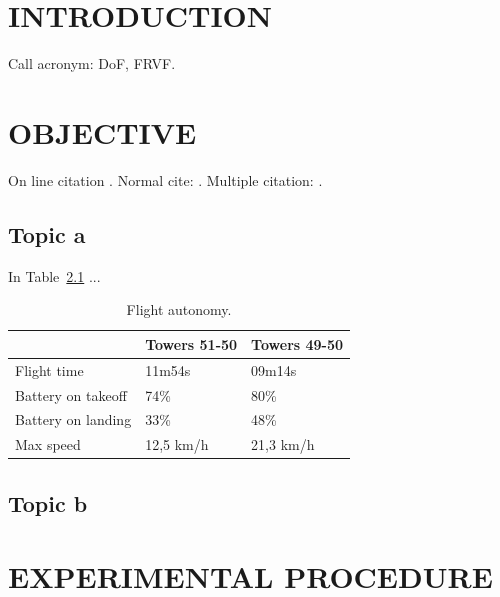 \chapter{INTRODUCTION}
\label{chap:introduction}

Call acronym: \ac{DoF}, \ac{FRVF}.

\lipsum[1-2]

\chapter{OBJECTIVE}
\label{chap:objetive}

On line citation .
Normal cite: \cite{earnshaw2014virtual}. Multiple citation: \cite{azuma1997survey, earnshaw2014virtual}.

\section{Topic a}

\lipsum[1]

In Table~\ref{tab:autonomy} ...

\begin{table}[htb]
	\centering
	\caption{Flight autonomy.}
	\label{tab:autonomy}
	\begin{tabular}{l|l|l|}
		\cline{2-3} & Towers 51-50 & Towers 49-50 \\ \hline
		\multicolumn{1}{|l|}{Flight time}         & 11m54s       & 09m14s       \\ \hline
		\multicolumn{1}{|l|}{Battery on takeoff} & 74\%         & 80\%         \\ \hline
		\multicolumn{1}{|l|}{Battery on landing}     & 33\%         & 48\%         \\ \hline
		\multicolumn{1}{|l|}{Max speed}    & 12,5 km/h    & 21,3 km/h    \\ \hline
	\end{tabular}
\end{table}

\section{Topic b}

\lipsum[1]

\chapter{EXPERIMENTAL PROCEDURE} 
\label{chap:methodology}

